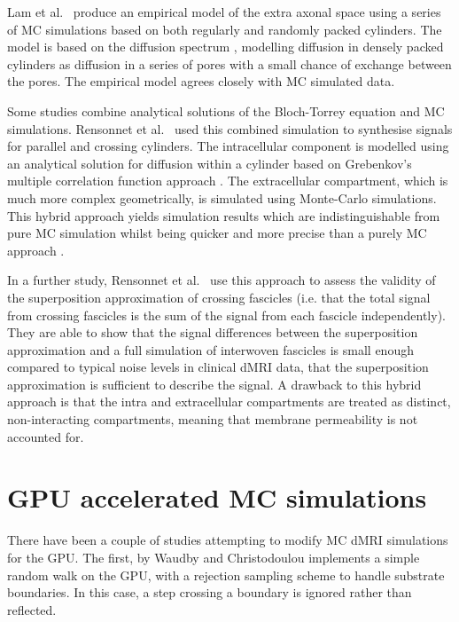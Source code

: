 Lam et al.\ \cite{Lam2015} produce an empirical model of the extra axonal space using a series of MC simulations based on both regularly and randomly packed cylinders. The model is based on the diffusion spectrum \cite{Stepisnik1993}, modelling diffusion in densely packed cylinders as diffusion in a series of pores with a small chance of exchange between the pores.
The empirical model agrees closely with MC simulated data.

Some studies combine analytical solutions of the Bloch-Torrey equation and MC simulations.
Rensonnet et al.\ \cite{Rensonnet2015} used this combined simulation to synthesise signals for parallel and crossing cylinders.
The intracellular component is modelled using an analytical solution for diffusion within a cylinder based on Grebenkov's multiple correlation function approach \cite{Grebenkov2008}.
The extracellular compartment, which is much more complex geometrically, is simulated using Monte-Carlo simulations.
This hybrid approach yields simulation results which are indistinguishable from pure MC simulation whilst being quicker and more precise than a purely MC approach \cite{Rensonnet2015}. 

In a further study, Rensonnet et al.\ \cite{Rensonnet2017} use this approach to assess the validity of the superposition approximation of crossing fascicles (i.e. that the total signal from crossing fascicles is the sum of the signal from each fascicle independently).
They are able to show that the signal differences between the superposition approximation and a full simulation of interwoven fascicles is small enough compared to typical noise levels in clinical dMRI data, that the superposition approximation is sufficient to describe the signal.
A drawback to this hybrid approach is that the intra and extracellular compartments are treated as distinct, non-interacting compartments, meaning that membrane permeability is not accounted for.

\section{\ac{GPU} accelerated \ac{MC} simulations}
\label{sec:review_gpu}
There have been a couple of studies attempting to modify \ac{MC} \ac{dMRI} simulations for the \ac{GPU}.
The first, by Waudby and Christodoulou \cite{Waudby2011} implements a simple random walk on the \ac{GPU}, with a rejection sampling scheme to handle substrate boundaries.
In this case, a step crossing a boundary is ignored rather than reflected.

